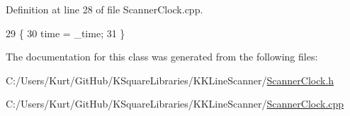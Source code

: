 Definition at line 28 of file Scanner\+Clock.\+cpp.


\begin{DoxyCode}
29 \{
30   time = \_time;
31 \}
\end{DoxyCode}


The documentation for this class was generated from the following files\+:\begin{DoxyCompactItemize}
\item 
C\+:/\+Users/\+Kurt/\+Git\+Hub/\+K\+Square\+Libraries/\+K\+K\+Line\+Scanner/\hyperlink{_scanner_clock_8h}{Scanner\+Clock.\+h}\item 
C\+:/\+Users/\+Kurt/\+Git\+Hub/\+K\+Square\+Libraries/\+K\+K\+Line\+Scanner/\hyperlink{_scanner_clock_8cpp}{Scanner\+Clock.\+cpp}\end{DoxyCompactItemize}

